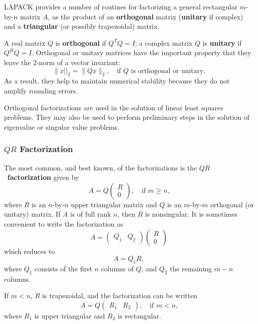 LAPACK provides a number of routines for factorizing a general
rectangular $m$-by-$n$ matrix $A$,
as the product of an {\bf orthogonal} matrix ({\bf unitary} if complex)
and a {\bf triangular} (or possibly trapezoidal) matrix.

A real matrix $Q$ is {\bf orthogonal} if $Q^{T} Q = I$;
a complex matrix $Q$ is {\bf unitary} if $Q^{H} Q = I$.
Orthogonal or unitary matrices have the important property that they leave the
2-norm of a vector invariant:
\[
\|x||_2 = \|Qx\|_2, \quad \mbox{if $Q$ is orthogonal or unitary.}
\]
As a result, they help to maintain numerical stability because they do not
 amplify rounding errors.

Orthogonal factorizations are used in
the solution of linear least squares problems.
They may also be used to perform preliminary steps in the solution of eigenvalue or
singular value problems.
 
\subsubsection{$QR$ Factorization}

The most common, and best known, of the factorizations
is the {\boldmath $QR$}~{\bf factorization}
given by
\[
A = Q\left( \begin{array}{c}R\\0\end{array}\right), \quad \mbox{if $m \ge n$,}
\]
where $R$ is an $n$-by-$n$ upper triangular matrix and $Q$ is an $m$-by-$m$
orthogonal (or unitary) matrix. If $A$ is of full rank $n$, then $R$ is
nonsingular.
It is sometimes convenient to write the factorization as
\[
A = \left( \begin{array}{cc} Q_1 & Q_2\end{array} \right)
    \left( \begin{array}{c}R\\0\end{array}\right)
\]
which reduces to
\[
A = Q_1 R ,
\]
where $Q_1$ consists of the first $n$ columns of $Q$, and $Q_2$ the
remaining $m-n$ columns.

If $m < n$, $R$ is trapezoidal, and the factorization can be written
\[
A = Q\left( \begin{array}{cc}R_1 & R_2\end{array}\right), \quad
    \mbox{if $m < n$,}
\]
where $R_1$ is upper triangular and $R_2$ is rectangular.

